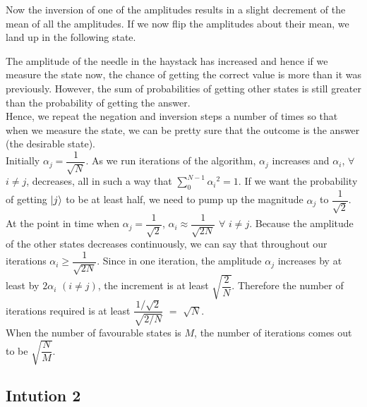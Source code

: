 \documentclass[a4paper]{article}
\begin{document}
Now the inversion of one of the amplitudes results in a slight decrement of the mean of all the amplitudes. If we now flip the amplitudes about their mean, we land up in the following state.


The amplitude of the needle in the haystack has increased and hence if we measure the state now, the chance of getting the correct value is more than it was previously. However, the sum of probabilities of getting other states is still greater than the probability of getting the answer.\\[4pt]

Hence, we repeat the negation and inversion steps a number of times so that when we measure the state, we can be pretty sure that the outcome is the answer (the desirable state).\\[4pt]

Initially $\alpha_j = \dfrac{1}{\sqrt{N}}$. As we run iterations of the algorithm, $\alpha_j$ increases and $\alpha_i$, $\forall$ $i \neq j$, decreases, all in such a way that $\sum_0 ^{N-1} {\alpha_i}^2 = 1$.
If we want the probability of getting $\ket{j}$ to be at least half, we need to pump up the magnitude $\alpha_j$ to $\dfrac{1}{\sqrt{2}}$. At the point in time when $\alpha_j = \dfrac{1}{\sqrt{2}}$, $\alpha_i \approx \dfrac{1}{\sqrt{2N}}$ $\forall$ $i \neq j$. Because the amplitude of the other states decreases continuously, we can say that throughout our iterations $\alpha_i \geq \dfrac{1}{\sqrt{2N}}$. Since in one iteration, the amplitude $\alpha_j$ increases by at least by $2 \alpha_i$ $\left( i \neq j\right)$, the increment is at least $\sqrt{\dfrac{2}{N}}$. Therefore the number of iterations required is at least $\dfrac{1 / \sqrt{2}}{\sqrt{2 / N}}$ $=$ $\sqrt{N}$.\\
When the number of favourable states is $M$, the number of iterations comes out to be $\sqrt{\dfrac{N}{M}}$.

\subsection{Intution 2}
\end{document}
